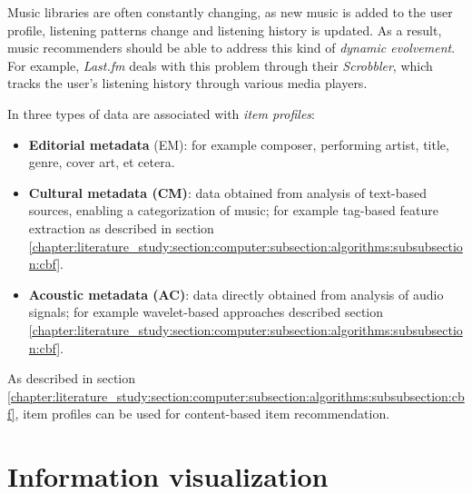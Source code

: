 Music libraries are often constantly changing, as new music is added to the user profile, listening patterns change and listening history is updated. As a result, music recommenders should be able to address this kind of \emph{dynamic evolvement}\cite{song:2012}. For example, \emph{Last.fm} deals with this problem through their \emph{Scrobbler}, which tracks the user's listening history through various media players\cite{lastfm:2013:scrobbling}.

In \cite{song:2012} three types of data are associated with \emph{item profiles}:

\begin{itemize}
	\item \textbf{Editorial metadata} (EM): for example composer, performing artist, title, genre, cover art, et cetera.
	\item \textbf{Cultural metadata (CM)}: data obtained from analysis of text-based sources, enabling a categorization of music; for example tag-based feature extraction as described in section \ref{chapter:literature_study:section:computer:subsection:algorithms:subsubsection:cbf}.
	\item \textbf{Acoustic metadata (AC)}: data directly obtained from analysis of audio signals; for example wavelet-based approaches described section \ref{chapter:literature_study:section:computer:subsection:algorithms:subsubsection:cbf}.
\end{itemize}

As described in section \ref{chapter:literature_study:section:computer:subsection:algorithms:subsubsection:cbf}, item profiles can be used for content-based item recommendation.














% 
\section{Information visualization}\label{chapter:literature_study:section:interaction}


